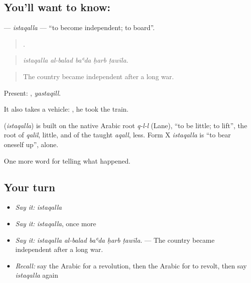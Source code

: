 \subsection*{You'll want to know: }
\textbf{} — \emph{istaqalla} — \textquotedblleft{}to become independent; to board\textquotedblright{}.

\begin{quote}
    .
\end{quote}

\begin{quote}
\emph{istaqalla al-balad baʿda ḥarb ṭawīla.}
\end{quote}

\begin{quote}
The country became independent after a long war.
\end{quote}

Present: , \emph{yastaqill}.

It also takes a vehicle:  , he took the train.

\begin{cousinweb}
\textbf{} (\emph{istaqalla}) is built on the native Arabic root \emph{q-l-l} (Lane), \textquotedblleft{}to be little; to lift\textquotedblright{}, the root of \emph{qalīl}, little, and of the taught \emph{aqall}, less. Form X \emph{istaqalla} is \textquotedblleft{}to bear oneself up\textquotedblright{}, alone.
\end{cousinweb}

\begin{grammarlens}[title={What you've built}]
One more word for telling what happened.
\end{grammarlens}

\subsection*{Your turn}
\begin{itemize}
\raggedright
  \item \emph{Say it:} \emph{istaqalla}
  \item \emph{Say it:} \emph{istaqalla}, once more
  \item \emph{Say it:} \emph{istaqalla al-balad baʿda ḥarb ṭawīla.} — The country became independent after a long war.
  \item \emph{Recall:} say the Arabic for a revolution, then the Arabic for to revolt, then say \emph{istaqalla} again
\end{itemize}

